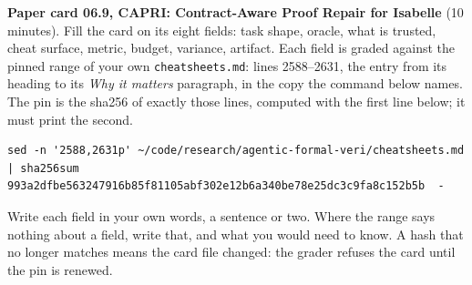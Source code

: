 \documentclass[11pt]{article}
\begin{document}
\begin{problem}\label{prob:B2}
\textbf{Paper card 06.9, CAPRI: Contract-Aware Proof Repair for Isabelle}
(10 minutes). Fill the card on its eight fields: task shape, oracle, what is
trusted, cheat surface, metric, budget, variance, artifact. Each field is
graded against the pinned range of your own \texttt{cheatsheets.md}: lines
2588--2631, the entry from its heading to its \emph{Why it matters}
paragraph, in the copy the command below names. The pin is the sha256 of
exactly those lines, computed with the first line below; it must print the
second.
{\small
\begin{verbatim}
sed -n '2588,2631p' ~/code/research/agentic-formal-veri/cheatsheets.md | sha256sum
993a2dfbe563247916b85f81105abf302e12b6a340be78e25dc3c9fa8c152b5b  -
\end{verbatim}
}
Write each field in your own words, a sentence or two. Where the range says
nothing about a field, write that, and what you would need to know. A hash
that no longer matches means the card file changed: the grader refuses the
card until the pin is renewed.
\end{problem}
\end{document}
